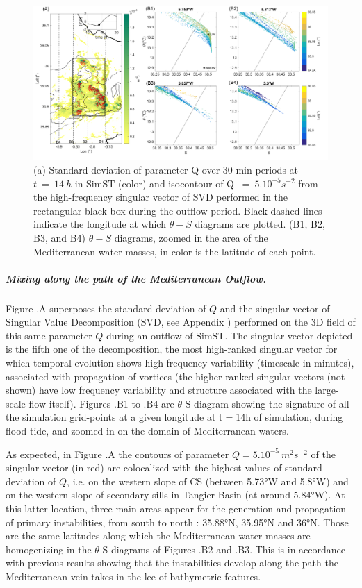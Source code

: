 \begin{figure}[!h]
 \includegraphics[width=\textwidth]{./GBR3D/TS_coupes_14H_VE2o.png}
 \caption [(A) Standard deviation of parameter Q and SVD field of Q. (B) $\theta-S$ diagrams.]{(a) Standard deviation of parameter Q over 30-min-periods at $t\ =\ 14\ h$ in SimST (color) and isocontour of Q $\ =\ 5.10^{-5} s^{-2}$ from the high-frequency singular vector of SVD performed in the rectangular black box during the outflow period. Black dashed lines indicate the longitude at which $\theta-S$ diagrams are plotted. (B1, B2, B3, and B4) $\theta-S$ diagrams, zoomed in the area of the Mediterranean water masses, in color is the latitude of each point.}
 \label{FigTSCS}
\end{figure}

\subparagraph{Mixing along the path of the Mediterranean Outflow.}
Figure .A superposes the standard deviation of $Q$ and the singular vector of Singular Value Decomposition (SVD, see Appendix ) performed on the 3D field of this same parameter $Q$ during an outflow of SimST. The singular vector depicted is the fifth one of the decomposition, the most high-ranked singular vector for which temporal evolution shows high frequency variability (timescale in minutes), associated with propagation of vortices (the higher ranked singular vectors (not shown) have low frequency variability and structure associated with the large-scale flow itself). Figures .B1 to .B4 are $\theta$-S diagram showing the signature of all the simulation grid-points at a given longitude at t$=$14h of simulation, during flood tide, and zoomed in on the domain of Mediterranean waters.

As expected, in Figure .A the contours of parameter $Q= 5.10^{-5}\ m^2s^{-2}$ of the singular vector (in red) are colocalized with the highest values of standard deviation of $Q$, i.e. on the western slope of CS (between 5.73°W and 5.8°W) and on the western slope of secondary sills in Tangier Basin (at around 5.84°W). At this latter location, three main areas appear for the generation and propagation of primary instabilities, from south to north : 35.88°N, 35.95°N and 36°N. Those are the same latitudes along which the Mediterranean water masses are homogenizing in the $\theta$-S diagrams of Figures .B2 and .B3. This is in accordance with previous results showing that the instabilities develop along the path the Mediterranean vein takes in the lee of bathymetric features. 

